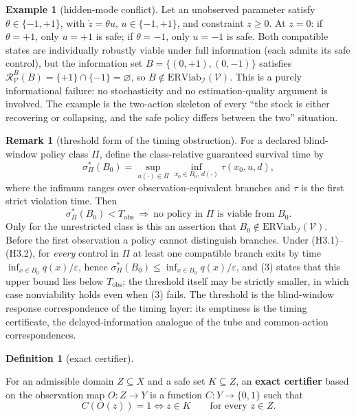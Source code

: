 \documentclass[11pt]{article}
\theoremstyle{definition}
\newtheorem{remark}{Remark}
\newtheorem{example}{Example}
\newtheorem{definition}{Definition}
\begin{document}
\begin{example}[hidden-mode conflict]\label{ex:hidden-mode} Let an unobserved parameter satisfy
\(\theta \in \{-1, +1\}\), with \(\dot z = \theta u\),
\(u \in \{-1, +1\}\), and constraint \(z \ge 0\). At \(z = 0\): if
\(\theta = +1\), only \(u = +1\) is safe; if \(\theta = -1\), only
\(u = -1\) is safe. Both compatible states are individually robustly
viable under full information (each admits its safe control), but the
information set \(B = \{(0, +1), (0, -1)\}\) satisfies
\(\mathcal{R}_{\mathcal{V}}^B(B) = \{+1\} \cap \{-1\} = \varnothing\),
so \(B \notin \mathrm{ERViab}_{\mathcal{I}}(\mathcal{V})\). This is a
purely informational failure: no stochasticity and no estimation-quality
argument is involved. The example is the two-action skeleton of every
``the stock is either recovering or collapsing, and the safe policy
differs between the two'' situation.

\end{example}

\begin{remark}[threshold form of the timing obstruction]\label{rem:sigma}
For a declared blind-window policy class \(\Pi\), define the
class-relative guaranteed survival time by
\[\sigma^*_{\Pi}(B_0)=\sup_{u(\cdot)\in\Pi}
\inf_{x_0\in B_0,\,d(\cdot)}\tau(x_0,u,d),\]
where the infimum ranges over observation-equivalent branches and
\(\tau\) is the first strict violation time. Then
\[\sigma^*_{\Pi}(B_0)<T_{\mathrm{obs}}\ \Longrightarrow\
\text{no policy in }\Pi\text{ is viable from }B_0.\]
Only for the unrestricted class is this an assertion that
\(B_0\notin\mathrm{ERViab}_{\mathcal I}(\mathcal V)\).
Before the first observation a policy cannot distinguish branches.
Under (H3.1)--(H3.2), for \emph{every} control in \(\Pi\) at least
one compatible branch exits by time
\(\inf_{x\in B_0}q(x)/\varepsilon\), hence
\(\sigma^*_{\Pi}(B_0)\le\inf_{x\in B_0}q(x)/\varepsilon\), and (3) states that
this upper bound lies below \(T_{\mathrm{obs}}\); the threshold itself
may be strictly smaller, in which case nonviability holds even when (3)
fails. The threshold is the blind-window response correspondence of the
timing layer: its emptiness is the timing certificate, the
delayed-information analogue of the tube and common-action
correspondences.
\end{remark}

\begin{definition}[exact certifier]\label{def:certifier}

For an admissible domain
\(Z \subseteq X\) and a safe set \(K \subseteq Z\), an \textbf{exact
certifier} based on the observation map \(O : Z \to Y\) is a function
\(C : Y \to \{0,1\}\) such that
\[C(O(z)) = 1 \iff z \in K \qquad \text{for every } z \in Z.\]

\end{definition}
\end{document}

